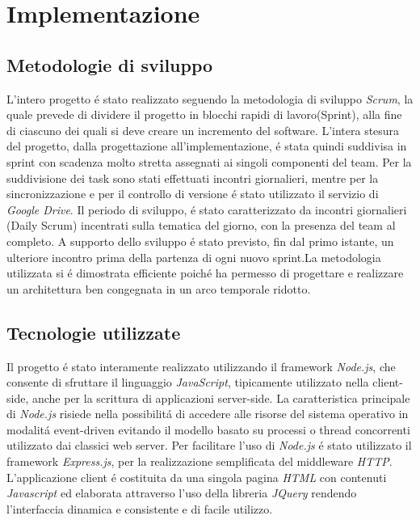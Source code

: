 \documentclass{sig-alternate-05-2015}
\begin{document}
\section{Implementazione}
\subsection{Metodologie di sviluppo}


L'intero progetto \'e stato realizzato seguendo la metodologia di sviluppo \textit{Scrum}, la quale prevede di dividere il progetto in blocchi rapidi di lavoro(Sprint), alla fine di ciascuno dei quali si deve creare un incremento del software. L'intera stesura del progetto, dalla progettazione all'implementazione, \'e stata quindi suddivisa in sprint con scadenza molto stretta assegnati ai singoli componenti del team. 
Per la suddivisione dei task sono stati effettuati incontri giornalieri, mentre per la sincronizzazione e per il controllo di versione \'e stato utilizzato il servizio di \textit{Google Drive}. Il periodo di sviluppo, \'e stato caratterizzato da incontri giornalieri (Daily Scrum) incentrati sulla tematica del giorno, con la presenza del team al completo. A supporto dello sviluppo \'e stato previsto, fin dal primo istante, un ulteriore incontro prima della partenza di ogni nuovo sprint.La metodologia utilizzata si \'e dimostrata efficiente poich\'e ha permesso di progettare e realizzare un architettura ben congegnata in un arco temporale ridotto.
\subsection{Tecnologie utilizzate}


Il progetto \'e stato interamente realizzato utilizzando il framework \textit{Node.js}, che consente di sfruttare il linguaggio \textit{JavaScript}, tipicamente utilizzato nella client-side, anche per la scrittura di applicazioni server-side. La caratteristica principale di \textit{Node.js} risiede nella possibilit\'a di accedere alle risorse del sistema operativo in modalit\'a event-driven evitando il modello basato su processi o thread concorrenti utilizzato dai classici web server. Per facilitare l'uso di \textit{Node.js} \'e stato utilizzato il framework \textit{Express.js}, per la realizzazione semplificata del middleware \textit{HTTP}.
 L'applicazione client \'e costituita da una singola pagina \textit{HTML} con contenuti \textit{Javascript} ed elaborata attraverso l'uso della libreria \textit{JQuery} rendendo l'interfaccia dinamica e consistente e di facile utilizzo. 
\end{document}
